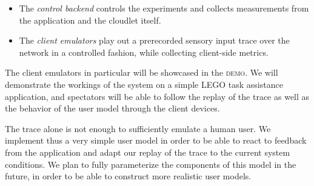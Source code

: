 \documentclass[portrait, a1]{KTHEEposter}
\begin{document}
\begin{pcolumns}[3]
\begin{pcolumn}[2]
\begin{pframe}[1.1]
                \begin{itemize}
                    \item The \emph{control backend} controls the experiments and collects measurements from the application and the cloudlet itself.
                    \item The \emph{client emulators} play out a prerecorded sensory input trace over the network in a controlled fashion, while collecting client-side metrics.
                \end{itemize}
                \medskip
                The client emulators in particular will be showcased in the \textsc{demo}.
                We will demonstrate the workings of the system on a simple LEGO task assistance application, and spectators will be able to follow the replay of the trace as well as the behavior of the user model through the client devices.
            \end{pframe}
            \begin{pframe}[.9]
                \smallskip
                \begin{center}
                    \medskip
                    
                    \medskip
                \end{center}
                The trace alone is not enough to sufficiently emulate a human user.
                We implement thus a very simple user model in order to be able to react to feedback from the application and adapt our replay of the trace to the current system conditions.
                We plan to fully parameterize the components of this model in the future, in order to be able to construct more realistic user models.
            \end{pframe}        
        \end{pcolumn}%
        \begin{pcolumn}[3]
            \begin{pframe}[1.95]

\end{pframe}
\end{pcolumn}
\end{pcolumns}
\end{document}
